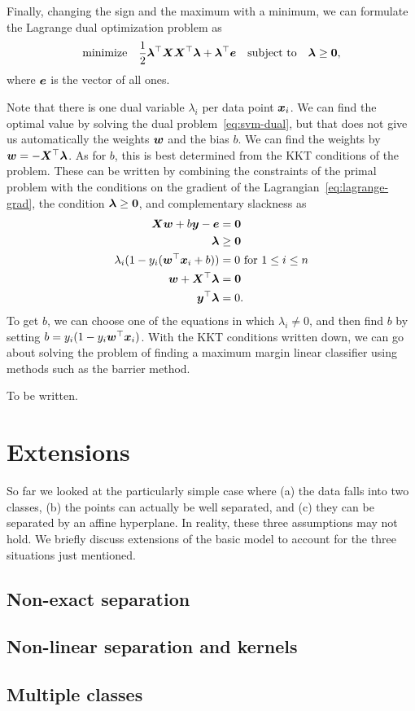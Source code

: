 Finally, changing the sign and the maximum with a minimum, we can formulate the Lagrange dual optimization problem as
\begin{equation}\label{eq:svm-dual}
\text{minimize}\quad \frac{1}{2}\bm{\lambda}^{\top}\bm{X}\bm{X}^{\top}\bm{\lambda}+ \bm{\lambda}^{\top}\bm{e} \quad\text{subject to}\quad \bm{\lambda}\geq \bm{0},
\end{equation}
where $\bm{e}$ is the vector of all ones. 

Note that there is one dual variable $\lambda_i$ per data point $\bm{x}_i$. We can find the optimal value by solving the dual problem~\eqref{eq:svm-dual}, but that does not give us automatically the weights $\bm{w}$ and the bias $b$. We can find the weights by $\bm{w}=-\bm{X}^{\top}\bm{\lambda}$. As for $b$, this is best determined from the KKT conditions of the problem. These can be written by combining the constraints of the primal problem with the conditions on the gradient of the Lagrangian~\eqref{eq:lagrange-grad}, the condition $\bm{\lambda}\geq \bm{0}$, and complementary slackness as
\begin{align*}
   \bm{X}\bm{w}+b\bm{y}-\bm{e} &= \bm{0}\\
   \bm{\lambda}&\geq \bm{0}\\
   \lambda_i (1-y_i(\bm{w}^{\top}\bm{x}_i+b)) &= 0 \text{ for } 1\leq i\leq n\\
   \bm{w}+\bm{X}^{\top}\bm{\lambda} &= \bm{0}\\
   \bm{y}^{\top}\bm{\lambda} &= 0.
\end{align*}
To get $b$, we can choose one of the equations in which $\lambda_i\neq 0$, and then find $b$ by setting $b= y_i(1-y_i\bm{w}^{\top}\bm{x}_i)$. With the KKT conditions written down, we can go about solving the problem of finding a maximum margin linear classifier using methods such as the barrier method.

\begin{example}
To be written.
\end{example}

\section{Extensions}
So far we looked at the particularly simple case where (a) the data falls into two classes, (b) the points can actually be well separated, and (c) they can be separated by an affine hyperplane. In reality, these three assumptions may not hold. We briefly discuss extensions of the basic model to account for the three situations just mentioned.

\subsection{Non-exact separation}

\subsection{Non-linear separation and kernels}

\subsection{Multiple classes}

